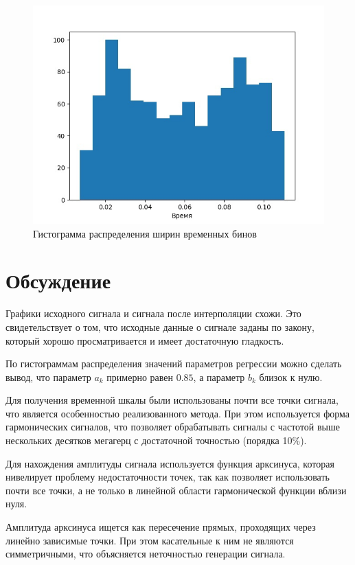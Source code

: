 \documentclass[12pt,a4paper]{article}
\begin{document}
\begin{figure}[H]
    \centering
    \includegraphics[scale=0.6]{images/hist.jpg}
    \caption{Гистограмма распределения ширин временных бинов}
\end{figure}

\section{Обсуждение}
Графики исходного сигнала и сигнала после интерполяции схожи. Это свидетельствует о том, что исходные данные о сигнале заданы по закону, который хорошо просматривается и имеет достаточную гладкость.

По гистограммам распределения значений параметров регрессии можно сделать вывод, что параметр $a_k$ примерно равен $0.85$, а параметр $b_k$ близок к нулю.

Для получения временной шкалы были использованы почти все точки сигнала, что является особенностью реализованного метода. При этом используется форма гармонических сигналов, что позволяет обрабатывать сигналы с частотой выше нескольких десятков мегагерц с достаточной точностью (порядка 10\%).

Для нахождения амплитуды сигнала используется функция арксинуса, которая нивелирует проблему недостаточности точек, так как позволяет использовать почти все точки, а не только в линейной области гармонической функции вблизи нуля.

Амплитуда арксинуса ищется как пересечение прямых, проходящих через
линейно зависимые точки. При этом касательные к ним не являются симметричными, что объясняется неточностью генерации сигнала.
\end{document}
